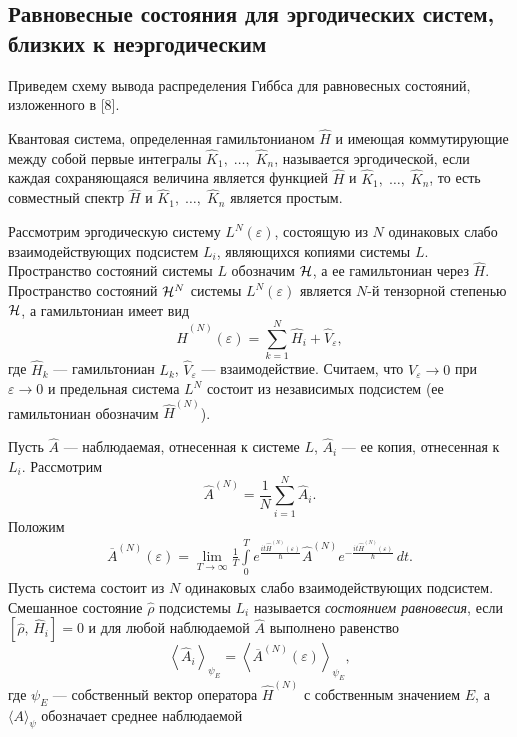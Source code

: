 \documentclass[a4paper
]{article}
\begin{document}
\subsection{Равновесные состояния для эргодических систем,\\
близких к неэргодическим} Приведем схему вывода распределения Гиббса для
равновесных состояний, изложенного в [8].
\begin{Def}
Квантовая система, определенная гамильтонианом $\hat H$ и имеющая
коммутирующие между собой первые интегралы $\hat K_1, \; \dots, \; \hat
K_n$, называется эргодической, если каждая сохраняющаяся величина
является функцией $\hat H$ и $\hat K_1, \; \dots, \; \hat K_n$, то есть
совместный спектр $\hat H$ и $\hat K_1, \; \dots, \; \hat K_n$ является
простым.
\end{Def}
Рассмотрим эргодическую систему $L^N(\varepsilon)$, состоящую из $N$ одинаковых слабо
взаимодействующих подсистем $L_i$, являющихся копиями системы $L$.
Пространство состояний системы $L$ обозначим ${\cal H}$, а ее гамильтониан
через $\hat H$. Пространство состояний
${\cal H}^N$ системы $L^N(\varepsilon)$ является $N$-й тензорной степенью
${\cal H}$, а гамильтониан имеет вид $$\hat H^{(N)}(\varepsilon)=\sum
\limits_{k=1}^N \hat H_i+\hat V_\varepsilon,$$ где $\hat H_k$ ---
гамильтониан $L_k$, $\hat V_\varepsilon$ --- взаимодействие. Считаем, что
$V_\varepsilon\rightarrow 0$ при $\varepsilon\rightarrow 0$ и предельная
система $L^N$ состоит из независимых подсистем (ее гамильтониан обозначим
$\hat H^{(N)}$). \par
Пусть $\hat A$ --- наблюдаемая, отнесенная к системе $L$, $\hat A_i$ ---
ее копия, отнесенная к $L_i$. Рассмотрим $$\hat A^{(N)}=\frac{1}{N}
\sum \limits_{i=1}^N \hat A_i.$$ Положим
\begin{align}
\label{vrem_srednee}
\overline A^{(N)}(\varepsilon)=\lim \limits_{T\rightarrow \infty}
\frac{1}{T}\int \limits_0^T e^{\frac{it\hat H^{(N)}(\varepsilon)}{\hbar}}
\hat A^{(N)}e^{-\frac{it\hat H^{(N)}(\varepsilon)}{\hbar}}\, dt.
\end{align}
Пусть система состоит из $N$ одинаковых слабо взаимодействующих подсистем.
Смешанное состояние $\hat \rho$ подсистемы $L_i$ называется {\it состоянием
равновесия}, если $[\hat \rho, \, \hat H_i]=0$ и для любой наблюдаемой
$\hat A$ выполнено равенство $$\left\langle \hat A_i\right\rangle_{\psi_E}=
\left\langle\overline A^{(N)}(\varepsilon)\right\rangle_{\psi_E},$$
где $\psi_E$ --- собственный вектор оператора $\hat H^{(N)}$ с собственным
значением $E$, а $\langle A\rangle_{\psi}$ обозначает среднее наблюдаемой
\end{document}
